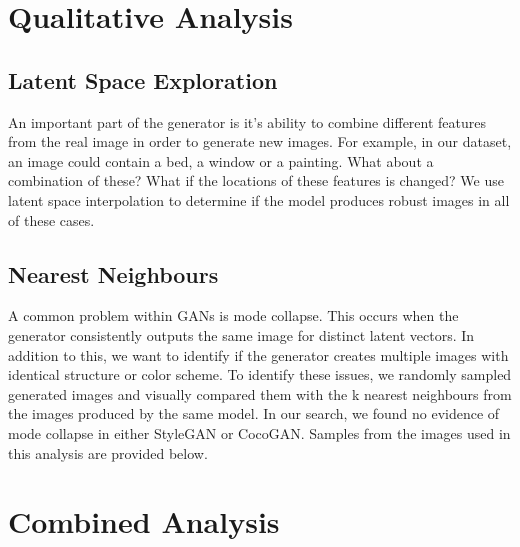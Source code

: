 \documentclass[12pt]{article}
\begin{document}
\begin{multicols*}{2}
        \section{Qualitative Analysis}
        \label{sec:qualitative}
        \subsection{Latent Space Exploration}
        \label{subsec:latentSpaceExploration}
        An important part of the generator is it's ability to combine different features from the real image in order to generate new images.
        For example, in our dataset, an image could contain a bed, a window or a painting. What about a combination of these?
        What if the locations of these features is changed? We use latent space interpolation to determine if the model produces robust images in all of these cases.

        \subsection{Nearest Neighbours}
        \label{subsec:nearestneighbours}
        A common problem within GANs is mode collapse.
        This occurs when the generator consistently outputs the same image for distinct latent vectors.
        In addition to this, we want to identify if the generator creates multiple images with identical structure or color scheme.
        To identify these issues, we randomly sampled generated images and visually compared them with the k nearest neighbours from the images produced by the same model.
        In our search, we found no evidence of mode collapse in either StyleGAN or CocoGAN. Samples from the images used in this analysis are provided below.

        \section{Combined Analysis}
        \label{sec:combinedAnalysis}

\end{multicols*}
\end{document}
